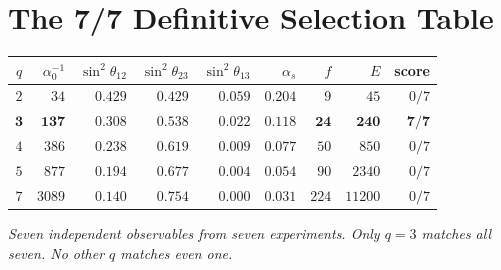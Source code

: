 \section{The 7/7 Definitive Selection Table}

\begin{center}
\begin{tabular}{@{}crrrrrrrr@{}}
\toprule
$q$ & $\alpha^{-1}_0$ & $\sin^2\theta_{12}$ & $\sin^2\theta_{23}$
& $\sin^2\theta_{13}$ & $\alpha_s$ & $f$ & $E$ & score \\
\midrule
$2$ & $34$ & $0.429$ & $0.429$ & $0.059$ & $0.204$ & $9$ & $45$ & $0/7$ \\
$\mathbf{3}$ & $\mathbf{137}$ & $\mathbf{0.308}$ & $\mathbf{0.538}$
& $\mathbf{0.022}$ & $\mathbf{0.118}$ & $\mathbf{24}$ & $\mathbf{240}$
& $\mathbf{7/7}$ \\
$4$ & $386$ & $0.238$ & $0.619$ & $0.009$ & $0.077$ & $50$ & $850$ & $0/7$ \\
$5$ & $877$ & $0.194$ & $0.677$ & $0.004$ & $0.054$ & $90$ & $2340$ & $0/7$ \\
$7$ & $3089$ & $0.140$ & $0.754$ & $0.000$ & $0.031$ & $224$ & $11200$ & $0/7$ \\
\bottomrule
\end{tabular}
\end{center}
\emph{Seven independent observables from seven experiments.
Only $q=3$ matches all seven. No other $q$ matches even one.}
